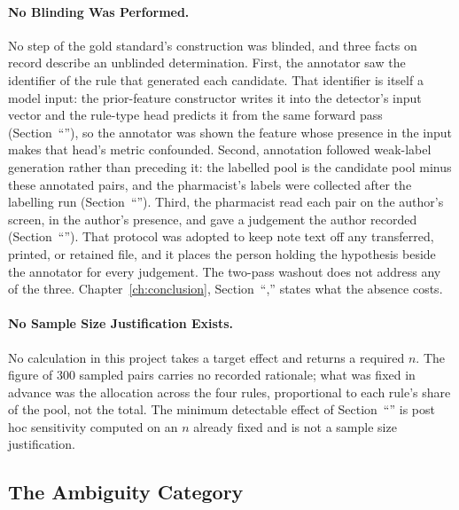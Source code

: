 \paragraph{No Blinding Was Performed.} No step of the gold standard's
construction was blinded, and three facts on record describe an unblinded
determination. First, the annotator saw the identifier of the rule that generated
each candidate. That identifier is itself a model input: the prior-feature
constructor writes it into the detector's input vector and the rule-type head
predicts it from the same forward pass
(Section~``''), so the annotator was shown the feature
whose presence in the input makes that head's metric confounded. Second,
annotation followed weak-label generation rather than preceding it: the labelled
pool is the candidate pool minus these annotated pairs, and the pharmacist's
labels were collected after the labelling run
(Section~``''). Third, the pharmacist read each pair on the
author's screen, in the author's presence, and gave a judgement the author
recorded (Section~``''). That protocol was adopted to keep
note text off any transferred, printed, or retained file, and it places the person
holding the hypothesis beside the annotator for every judgement. The two-pass
washout does not address any of the three. Chapter~\ref{ch:conclusion},
Section~``,'' states what the absence costs.

\paragraph{No Sample Size Justification Exists.} No calculation in this project
takes a target effect and returns a required $n$. The figure of $300$ sampled
pairs carries no recorded rationale; what was fixed in advance was the allocation
across the four rules, proportional to each rule's share of the pool, not the
total. The minimum detectable effect of Section~``'' is post
hoc sensitivity computed on an $n$ already fixed and is not a sample size
justification.

\subsection{The Ambiguity Category}

